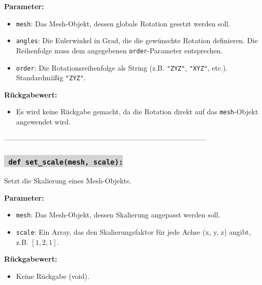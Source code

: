 \noindent \textbf{Parameter:} \vspace{-6ex} \\
\begin{itemize}
    \setlength{\itemindent}{1em}
    \item \texttt{mesh}: Das Mesh-Objekt, dessen globale Rotation gesetzt werden soll.
    \item \texttt{angles}: Die Eulerwinkel in Grad, die die gewünschte Rotation definieren. Die Reihenfolge muss dem angegebenen \texttt{order}-Parameter entsprechen.
    \item \texttt{order}: Die Rotationsreihenfolge als String (z.B. \texttt{"ZYZ"}, \texttt{"XYZ"}, etc.). Standardmäßig \texttt{"ZYZ"}.
\end{itemize}

\noindent \textbf{Rückgabewert:} \vspace{-6ex} \\
\begin{itemize}
    \setlength{\itemindent}{1em}
    \item Es wird keine Rückgabe gemacht, da die Rotation direkt auf das \texttt{mesh}-Objekt angewendet wird.
\end{itemize}

--------------------------------------------------------------------------------------


\subsubsection*{\colorbox{lightgray}{\texttt{\textbf{\color{green} def} \color{blue} set\_scale}\textbf{\texttt{(mesh, scale):}}}}
Setzt die Skalierung eines Mesh-Objekts.

\noindent \textbf{Parameter:} \vspace{-6ex} \\
\begin{itemize}
    \setlength{\itemindent}{1em}
    \item \texttt{mesh}: Das Mesh-Objekt, dessen Skalierung angepasst werden soll.
    \item \texttt{scale}: Ein Array, das den Skalierungsfaktor für jede Achse (x, y, z) angibt, z.B. \([1, 2, 1]\).
\end{itemize}

\noindent \textbf{Rückgabewert:} \vspace{-6ex} \\
\begin{itemize}
    \setlength{\itemindent}{1em}
    \item Keine Rückgabe (void).
\end{itemize}

